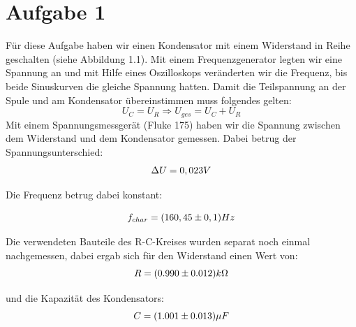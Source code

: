 \section{Aufgabe 1}
\begin{center}
\begin{minipage}{\linewidth}
\centering
{}
%
\label{schaltplan_nr1}
\end{minipage}
\end{center}

Für diese Aufgabe haben wir einen Kondensator mit einem Widerstand in Reihe geschalten (siehe Abbildung 1.1). Mit einem Frequenzgenerator legten wir eine Spannung an und mit Hilfe eines Oszilloskops veränderten wir die Frequenz, bis beide Sinuskurven die gleiche Spannung hatten. 
Damit die Teilspannung an der Spule und am Kondensator übereinstimmen muss folgendes gelten:
\begin{equation}
U_C = U_R 	\Rightarrow	 U_{ges} = U_C + U_R
\end{equation}
Mit einem Spannungsmessgerät (Fluke 175) haben wir die Spannung zwischen dem Widerstand und dem Kondensator gemessen. Dabei betrug der Spannungsunterschied:
\begin{equation}
\notag
\Delta U=0,023 V
\end{equation}

Die Frequenz betrug dabei konstant:

\begin{equation}\notag
f_{char} = (160,45\pm 0,1) Hz
\end{equation}

Die verwendeten Bauteile des R-C-Kreises wurden separat noch einmal nachgemessen, dabei ergab sich für den Widerstand einen Wert von:
\begin{equation}\notag
R = (0.990 \pm 0.012)k\Omega
\end{equation}

und die Kapazität des Kondensators:
\begin{equation}\notag
C = (1.001 \pm 0.013)\mu F
\end{equation}

